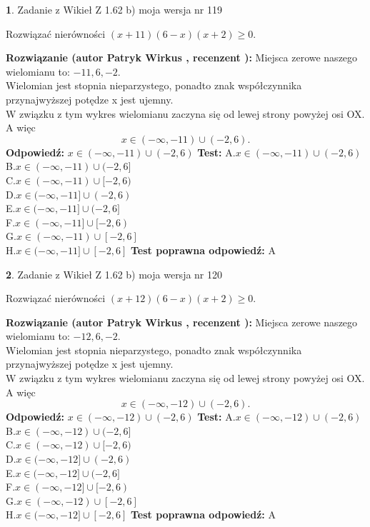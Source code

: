 \documentclass[12pt, a4paper]{article}
\theoremstyle{definition} %
\newtheorem{zad}{}
\newcommand{\zadStart}[1]{\begin{zad}#1\newline}
\newcommand{\zadStop}{\end{zad}}
\newcommand{\rozwStart}[2]{\noindent \textbf{Rozwiązanie (autor #1 , recenzent #2): }\newline}
\newcommand{\rozwStop}{\newline}
\newcommand{\odpStart}{\noindent \textbf{Odpowiedź:}\newline}
\newcommand{\odpStop}{\newline}
\newcommand{\testStart}{\noindent \textbf{Test:}\newline}
\newcommand{\testStop}{\newline}
\newcommand{\kluczStart}{\noindent \textbf{Test poprawna odpowiedź:}\newline}
\newcommand{\kluczStop}{\newline}
\begin{document}
\zadStart{Zadanie z Wikieł Z 1.62 b) moja wersja nr 119}

Rozwiązać nierówności $(x+11)(6-x)(x+2)\ge0$.
\zadStop
\rozwStart{Patryk Wirkus}{}
Miejsca zerowe naszego wielomianu to: $-11, 6, -2$.\\
Wielomian jest stopnia nieparzystego, ponadto znak współczynnika przy\linebreak najwyższej potędze x jest ujemny.\\ W związku z tym wykres wielomianu zaczyna się od lewej strony powyżej osi OX. A więc $$x \in (-\infty,-11) \cup (-2,6).$$
\rozwStop
\odpStart
$x \in (-\infty,-11) \cup (-2,6)$
\odpStop
\testStart
A.$x \in (-\infty,-11) \cup (-2,6)$\\
B.$x \in (-\infty,-11) \cup (-2,6]$\\
C.$x \in (-\infty,-11) \cup [-2,6)$\\
D.$x \in (-\infty,-11] \cup (-2,6)$\\
E.$x \in (-\infty,-11] \cup (-2,6]$\\
F.$x \in (-\infty,-11] \cup [-2,6)$\\
G.$x \in (-\infty,-11) \cup [-2,6]$\\
H.$x \in (-\infty,-11] \cup [-2,6]$
\testStop
\kluczStart
A
\kluczStop



\zadStart{Zadanie z Wikieł Z 1.62 b) moja wersja nr 120}

Rozwiązać nierówności $(x+12)(6-x)(x+2)\ge0$.
\zadStop
\rozwStart{Patryk Wirkus}{}
Miejsca zerowe naszego wielomianu to: $-12, 6, -2$.\\
Wielomian jest stopnia nieparzystego, ponadto znak współczynnika przy\linebreak najwyższej potędze x jest ujemny.\\ W związku z tym wykres wielomianu zaczyna się od lewej strony powyżej osi OX. A więc $$x \in (-\infty,-12) \cup (-2,6).$$
\rozwStop
\odpStart
$x \in (-\infty,-12) \cup (-2,6)$
\odpStop
\testStart
A.$x \in (-\infty,-12) \cup (-2,6)$\\
B.$x \in (-\infty,-12) \cup (-2,6]$\\
C.$x \in (-\infty,-12) \cup [-2,6)$\\
D.$x \in (-\infty,-12] \cup (-2,6)$\\
E.$x \in (-\infty,-12] \cup (-2,6]$\\
F.$x \in (-\infty,-12] \cup [-2,6)$\\
G.$x \in (-\infty,-12) \cup [-2,6]$\\
H.$x \in (-\infty,-12] \cup [-2,6]$
\testStop
\kluczStart
A
\kluczStop
\end{document}
